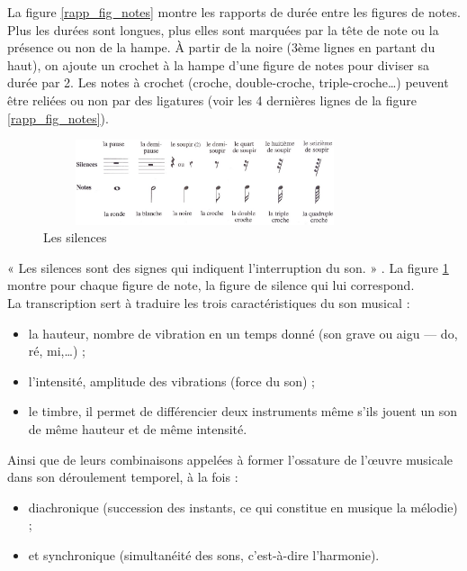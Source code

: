La figure \ref{rapp_fig_notes} montre les rapports de durée entre les figures
de notes. Plus les durées sont longues, plus elles sont marquées par la tête de
note ou la présence ou non de la hampe. À partir de la noire (3ème lignes en
partant du haut), on ajoute un crochet à la hampe d’une figure de notes pour
diviser sa durée par 2. 
Les notes à crochet (croche, double-croche, triple-croche…) 
peuvent être reliées ou non par des ligatures (voir les 4 dernières lignes de
la figure \ref{rapp_fig_notes}).\newpage
\begin{figure}[h]
	\centering
	\includegraphics[height=25mm, width=95mm]{
    z_images/3_methodes/0_notation_de_la_batterie/4_silences.png}
	\caption{Les silences}
	\label{silences}
\end{figure}
« Les silences sont des signes qui indiquent l’interruption du son. »
\cite{danhauser}. La figure \ref{silences} montre pour chaque figure de note,
la figure de silence qui lui correspond.\\

La transcription sert à traduire les trois caractéristiques du son musical :
\begin{itemize}
	\item la hauteur, nombre de vibration en un temps donné (son grave ou
        aigu — do, ré, mi,…) ;
	\item l’intensité, amplitude des vibrations (force du son) ;
	\item le timbre, il permet de différencier deux instruments même s’ils
        jouent un son de même hauteur et de même intensité.
\end{itemize}

Ainsi que de leurs combinaisons appelées à former l’ossature de l’œuvre
musicale dans son déroulement temporel, à la fois :
\begin{itemize}
	\item diachronique (succession des instants, ce qui constitue en musique la
        mélodie) ;
	\item et synchronique (simultanéité des sons, c’est-à-dire l’harmonie).
\end{itemize}
